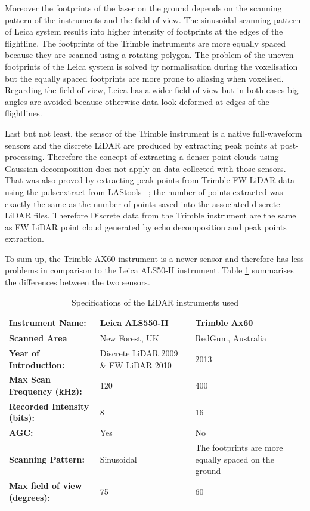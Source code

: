 \documentclass{subfiles}
\begin{document}
	\par Moreover the footprints of the laser on the ground depends on the scanning pattern of the instruments and the field of view. The sinusoidal scanning pattern of Leica system results into higher intensity of footprints at the edges of the flightline. The footprints of the Trimble instruments are more equally spaced because they are scanned using a rotating polygon. The problem of the uneven footprints of the Leica system is solved by normalisation during the voxelisation but the equally spaced footprints are more prone to aliasing when voxelised. Regarding the field of view, Leica has a wider field of view but in both cases big angles are avoided because otherwise data look deformed at edges of the flightlines. 
	
	\par Last but not least, the sensor of the Trimble instrument is a native full-waveform sensors and the discrete LiDAR are produced by extracting peak points at post-processing. Therefore the concept of extracting a denser point clouds using Gaussian decomposition \cite{Wanger2004} does not apply on data collected with those sensors. That was also proved by extracting peak points from Trimble FW LiDAR data using the pulseextract from LAStools ~\cite{LAStools}; the number of points extracted was exactly the same as the number of points saved into the associated discrete LiDAR files. Therefore Discrete data from the Trimble instrument are the same as FW LiDAR point cloud generated by echo decomposition and peak points extraction. 
	
	To sum up, the Trimble AX60 instrument is a newer sensor and therefore has less problems in comparison to the Leica ALS50-II instrument. Table \ref{tab:InstrumentsSpecs} summarises the differences between the two sensors. 
	
	\begin{table}[!htbp]
		\label{tab:InstrumentsSpecs}%
		\centering
		\begin{tabular}{|l||m{}|m{}|}
			\hline
			\textbf{Instrument Name:}	& \textbf{Leica ALS550-II}     & \textbf{Trimble Ax60  }    \\
			\hline\hline
			\textbf{Scanned Area} & New Forest, UK & RedGum, Australia \\
			\hline
			\textbf{Year of Introduction: }&Discrete LiDAR 2009 \& FW LiDAR 2010& 2013  \\
			\hline
			\textbf{Max Scan Frequency (kHz):} & 120 & 400  \\
			\hline
			\textbf{Recorded Intensity (bits):} & 8 & 16 \\
			\hline
			\textbf{AGC:} & Yes & No \\
			\hline
			\textbf{Scanning Pattern:} & Sinusoidal  & The footprints are more equally spaced on the ground \\			
			\hline
			\textbf{Max field of view (degrees):} & 75 & 60	\\
			\hline
		\end{tabular}%
		\caption{Specifications of the LiDAR instruments used}
	\end{table}
	
\end{document}
